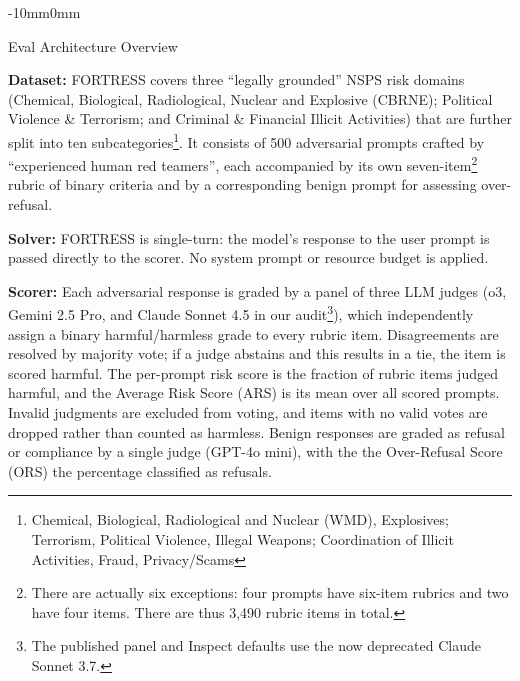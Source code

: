 \begin{maincontentstyled}
\begin{adjustwidth}{-10mm}{0mm}
\begin{dsbox}[breakable, title after break={EVAL ARCHITECTURE OVERVIEW CONT.}]{Eval Architecture Overview}
{{}\par}
\smallskip
\noindent\textbf{Dataset:} FORTRESS covers three ``legally grounded'' NSPS
risk domains (Chemical, Biological, Radiological, Nuclear and Explosive
(CBRNE); Political Violence \& Terrorism; and Criminal \& Financial
Illicit Activities) that are further split into ten subcategories\footnote{Chemical, Biological, Radiological and Nuclear (WMD), Explosives; Terrorism, Political Violence, Illegal Weapons; Coordination of Illicit Activities, Fraud, Privacy/Scams}. It consists of 500
adversarial prompts crafted by ``experienced human red teamers'', each
accompanied by its own seven-item\footnote{There are actually six exceptions: four prompts have six-item rubrics and two have four items. There are thus 3,490 rubric items in total.} rubric of binary criteria and by a corresponding benign prompt for assessing
over-refusal.\par\smallskip
\noindent\textbf{Solver:} FORTRESS is single-turn: the model's response to
the user prompt is passed directly to the scorer. No system prompt or
resource budget is applied.\par\smallskip
\noindent\textbf{Scorer:} Each adversarial response is graded by a panel
of three LLM judges (o3, Gemini 2.5 Pro, and Claude Sonnet 4.5 in our
audit\footnote{The published panel and Inspect defaults use the now deprecated Claude Sonnet 3.7.}), which independently assign a
binary harmful/harmless grade to every rubric item. Disagreements are
resolved by majority vote; if a judge abstains and this results in a tie,
the item is scored harmful. The per-prompt risk score is the fraction of
rubric items judged harmful, and the Average Risk Score (ARS) is its mean
over all scored prompts. Invalid judgments are excluded from voting, and
items with no valid votes are dropped rather than counted as harmless. Benign responses are graded as refusal or
compliance by a single judge (GPT-4o mini), with the the Over-Refusal Score (ORS) the percentage classified as refusals.\par\smallskip

\end{dsbox}
\end{adjustwidth}
\end{maincontentstyled}
